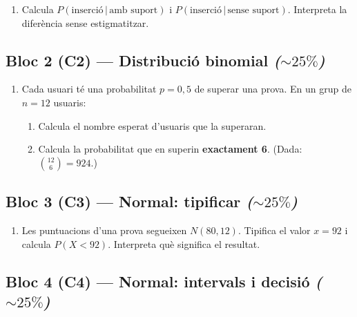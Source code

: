\begin{enumerate}[label=\textbf{\arabic*.}, leftmargin=2em, itemsep=7pt]
  \item Calcula $P(\text{inserció}\,|\,\text{amb suport})$ i
        $P(\text{inserció}\,|\,\text{sense suport})$. Interpreta la diferència sense
        estigmatitzar.
\end{enumerate}

\subsection*{Bloc 2 (C2) — Distribució binomial \hfill \normalfont\itshape ($\sim 25\%$)}

\begin{enumerate}[label=\textbf{\arabic*.}, leftmargin=2em, itemsep=7pt, start=2]
  \item Cada usuari té una probabilitat $p=0,5$ de superar una prova. En un grup de
        $n=12$ usuaris:
        \begin{enumerate}[label=\alph*), leftmargin=1.6em, topsep=2pt, itemsep=2pt]
          \item Calcula el nombre esperat d'usuaris que la superaran.
          \item Calcula la probabilitat que en superin \textbf{exactament 6}.
                (Dada: $\binom{12}{6}=924$.)
        \end{enumerate}
\end{enumerate}

\subsection*{Bloc 3 (C3) — Normal: tipificar \hfill \normalfont\itshape ($\sim 25\%$)}

\begin{enumerate}[label=\textbf{\arabic*.}, leftmargin=2em, itemsep=7pt, start=3]
  \item Les puntuacions d'una prova segueixen $N(80,12)$. Tipifica el valor $x=92$ i
        calcula $P(X<92)$. Interpreta què significa el resultat.
\end{enumerate}

\subsection*{Bloc 4 (C4) — Normal: intervals i decisió \hfill \normalfont\itshape ($\sim 25\%$)}

